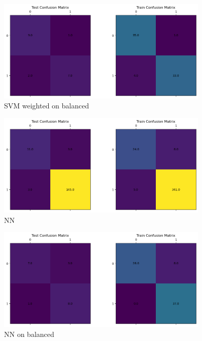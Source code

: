 \documentclass[12pt]{article}
\begin{document}

        \begin{figure}[h!]
            \centering
            \includegraphics[width=0.9\textwidth]{resources/conf_svm_weighted_balanced.png}
            \caption{SVM weighted on balanced}
            \label{fig:conf_svm_weighted_on_balanced}
        \end{figure}

        \newpage


        \begin{figure}[h!]
            \centering
            \includegraphics[width=0.9\textwidth]{resources/conf_nn_baseline.png}
            \caption{NN}
            \label{fig:conf_nn_baseline}
        \end{figure}


        \begin{figure}[h!]
            \centering
            \includegraphics[width=0.9\textwidth]{resources/conf_nn_baseline_balanced.png}
            \caption{NN on balanced}
            \label{fig:conf_nn_baseline_on_balanced}
        \end{figure}
\end{document}
